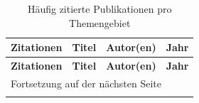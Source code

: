 {
\tiny
\centering
\begin{longtable}{|c|p{6cm}|p{3cm}|c|}
    \caption{Häufig zitierte Publikationen pro Themengebiet\label{tab:zitationen}} \\
    \hline
    \textbf{Zitationen} & \textbf{Titel} & \textbf{Autor(en)} & \textbf{Jahr} \\
    \hline
    \endfirsthead

    \hline
    \textbf{Zitationen} & \textbf{Titel} & \textbf{Autor(en)} & \textbf{Jahr} \\
    \hline
    \endhead

    \hline
    \multicolumn{4}{l}{Fortsetzung auf der nächsten Seite} \\
    \hline
    \endfoot

    \hline
    \endlastfoot


\end{longtable}}
